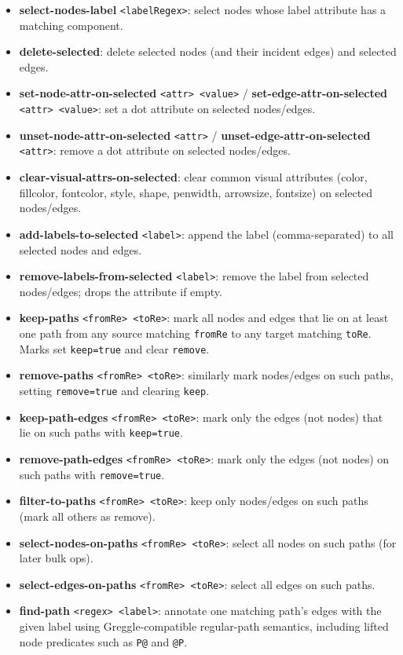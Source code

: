 \documentclass[11pt]{article}
\begin{document}
\begin{itemize}[leftmargin=*]
  \item \textbf{select-nodes-label} \texttt{<labelRegex>}: select nodes whose label attribute has a matching component.
  \item \textbf{delete-selected}: delete selected nodes (and their incident edges) and selected edges.
  \item \textbf{set-node-attr-on-selected} \texttt{<attr> <value>} / \textbf{set-edge-attr-on-selected} \texttt{<attr> <value>}: set a dot attribute on selected nodes/edges.
  \item \textbf{unset-node-attr-on-selected} \texttt{<attr>} / \textbf{unset-edge-attr-on-selected} \texttt{<attr>}: remove a dot attribute on selected nodes/edges.
  \item \textbf{clear-visual-attrs-on-selected}: clear common visual attributes (color, fillcolor, fontcolor, style, shape, penwidth, arrowsize, fontsize) on selected nodes/edges.
  \item \textbf{add-labels-to-selected} \texttt{<label>}: append the label (comma-separated) to all selected nodes and edges.
  \item \textbf{remove-labels-from-selected} \texttt{<label>}: remove the label from selected nodes/edges; drops the attribute if empty.
  \item \textbf{keep-paths} \texttt{<fromRe> <toRe>}: mark all nodes and edges that lie on at least one path from any source matching \texttt{fromRe} to any target matching \texttt{toRe}. Marks set \texttt{keep=true} and clear \texttt{remove}.
  \item \textbf{remove-paths} \texttt{<fromRe> <toRe>}: similarly mark nodes/edges on such paths, setting \texttt{remove=true} and clearing \texttt{keep}.
  \item \textbf{keep-path-edges} \texttt{<fromRe> <toRe>}: mark only the edges (not nodes) that lie on such paths with \texttt{keep=true}.
  \item \textbf{remove-path-edges} \texttt{<fromRe> <toRe>}: mark only the edges (not nodes) on such paths with \texttt{remove=true}.
  \item \textbf{filter-to-paths} \texttt{<fromRe> <toRe>}: keep only nodes/edges on such paths (mark all others as remove).
  \item \textbf{select-nodes-on-paths} \texttt{<fromRe> <toRe>}: select all nodes on such paths (for later bulk ops).
  \item \textbf{select-edges-on-paths} \texttt{<fromRe> <toRe>}: select all edges on such paths.
  \item \textbf{find-path} \texttt{<regex> <label>}: annotate one matching path's edges with the given label using Greggle-compatible regular-path semantics, including lifted node predicates such as \texttt{P@} and \texttt{@P}.

\end{itemize}
\end{document}
